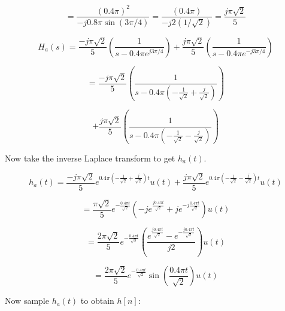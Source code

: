 \documentclass[fleqn]{article}
\begin{document}
\begin{enumerate}[nolistsep]
\begin{enumerate}[nolistsep]
				\begin{equation*}
					  = \frac{(0.4\pi)^2}{-j0.8{\pi}\sin(3\pi/4)} = \frac{(0.4\pi)}{-j2(1/\sqrt{2})} = \frac{j\pi\sqrt{2}}{5}
				\end{equation*}
				
				\begin{equation*}
					H_a(s) = \frac{-j\pi\sqrt{2}}{5}\left(\frac{1}{s - 0.4{\pi}e^{j3\pi/4}}\right) + \frac{j\pi\sqrt{2}}{5}\left(\frac{1}{s - 0.4{\pi}e^{-j3\pi/4}}\right)
				\end{equation*}
				
				\begin{equation*}
					= \frac{-j\pi\sqrt{2}}{5}\left(\frac{1}{s - 0.4{\pi}\left(-\frac{1}{\sqrt{2}} + \frac{j}{\sqrt{2}}\right)}\right)
				\end{equation*}
				
				\begin{equation*}
					 + \frac{j\pi\sqrt{2}}{5}\left(\frac{1}{s - 0.4{\pi}\left(-\frac{1}{\sqrt{2}} - \frac{j}{\sqrt{2}}\right)}\right)
				\end{equation*}
				
				Now take the inverse Laplace transform to get $h_a(t)$.
				
				\begin{equation*}
					h_a(t) = \frac{-j\pi\sqrt{2}}{5}e^{0.4\pi\left(-\frac{1}{\sqrt{2}} + \frac{j}{\sqrt{2}}\right)t}u(t) + \frac{j\pi\sqrt{2}}{5}e^{0.4\pi\left(-\frac{1}{\sqrt{2}} - \frac{j}{\sqrt{2}}\right)t}u(t)
				\end{equation*}
				
				\begin{equation*}
					= \frac{\pi\sqrt{2}}{5}e^{-\frac{0.4{\pi}t}{\sqrt{2}}}\left(-je^{\frac{j0.4{\pi}t}{\sqrt{2}}} + je^{-j\frac{0.4{\pi}t}{\sqrt{2}}}\right)u(t)
				\end{equation*}
				
				\begin{equation*}
					= \frac{2\pi\sqrt{2}}{5}e^{-\frac{0.4{\pi}t}{\sqrt{2}}}\left(\frac{e^{\frac{j0.4{\pi}t}{\sqrt{2}}} - e^{-\frac{j0.4{\pi}t}{\sqrt{2}}}}{j2}\right)u(t)
				\end{equation*}
				
				\begin{equation*}
					 = \frac{2\pi\sqrt{2}}{5}e^{-\frac{0.4{\pi}t}{\sqrt{2}}}\sin{\left(\frac{0.4{\pi}t}{\sqrt{2}}\right)}u(t)
				\end{equation*}
				
				Now sample $h_a(t)$ to obtain $h[n]$:
				

\end{enumerate}
\end{enumerate}
\end{document}
